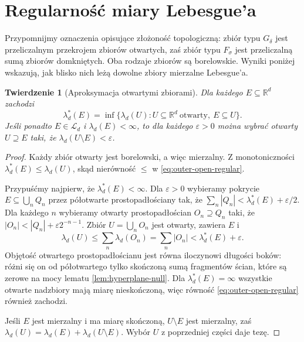 \documentclass[11pt,a4paper,oneside]{book}
\numberwithin{equation}{chapter}
\theoremstyle{plain}
\newtheorem{twierdzenie}{Twierdzenie}[chapter]
\theoremstyle{definition}
\theoremstyle{remark}
\begin{document}
\section{Regularność miary Lebesgue'a}

Przypomnijmy oznaczenia opisujące złożoność topologiczną:
zbiór typu $G_\delta$ jest przeliczalnym przekrojem zbiorów
otwartych, zaś zbiór typu $F_\sigma$ jest przeliczalną
sumą zbiorów domkniętych. Oba rodzaje zbiorów są borelowskie.
Wyniki poniżej wskazują, jak blisko nich leżą dowolne
zbiory mierzalne Lebesgue'a.

\begin{twierdzenie}[Aproksymacja otwartymi zbiorami]
\label{thm:lebesgue-outer-regular}
Dla każdego $E\subseteq\mathbb R^d$ zachodzi
\begin{equation}\label{eq:outer-open-regular}
\lambda_d^*(E)=\inf\{\lambda_d(U):
U\subseteq\mathbb R^d\ \text{otwarty},\ E\subseteq U\}.
\end{equation}
Jeśli ponadto $E\in\mathcal L_d$ i
$\lambda_d(E)<\infty$, to dla każdego
$\varepsilon>0$ można wybrać otwarty $U\supseteq E$
taki, że $\lambda_d(U\setminus E)<\varepsilon$.
\end{twierdzenie}

\begin{proof}
Każdy zbiór otwarty jest borelowski, a więc
mierzalny. Z monotoniczności
$\lambda_d^*(E)\le\lambda_d(U)$, skąd nierówność
$\le$ w \eqref{eq:outer-open-regular}.

Przypuśćmy najpierw, że $\lambda_d^*(E)<\infty$.
Dla $\varepsilon>0$ wybieramy pokrycie
$E\subseteq\bigcup_nQ_n$ przez półotwarte
prostopadłościany tak, że
$\sum_n|Q_n|<\lambda_d^*(E)+\varepsilon/2$.
Dla każdego $n$ wybieramy otwarty prostopadłościan
$O_n\supseteq Q_n$ taki, że
$|O_n|<|Q_n|+\varepsilon2^{-n-1}$.
Zbiór $U=\bigcup_nO_n$ jest otwarty, zawiera $E$ i
\[
\lambda_d(U)\le\sum_n\lambda_d(O_n)
=\sum_n|O_n|<\lambda_d^*(E)+\varepsilon.
\]
Objętość otwartego prostopadłościanu jest równa
iloczynowi długości boków: różni się on od
półotwartego tylko skończoną sumą fragmentów ścian,
które są zerowe na mocy lematu \ref{lem:hyperplane-null}.
Dla $\lambda_d^*(E)=\infty$ wszystkie otwarte
nadzbiory mają miarę nieskończoną, więc równość
\eqref{eq:outer-open-regular} również zachodzi.

Jeśli $E$ jest mierzalny i ma miarę skończoną,
$U\setminus E$ jest mierzalny, zaś
$\lambda_d(U)=\lambda_d(E)+\lambda_d(U\setminus E)$.
Wybór $U$ z poprzedniej części daje tezę.
\end{proof}
\end{document}
